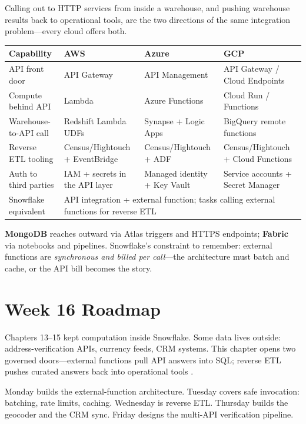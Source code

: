 \begin{crosscloud}
Calling out to HTTP services from inside a warehouse, and pushing warehouse results back to operational tools, are the two directions of the same integration problem---every cloud offers both.

\vspace{2mm}
{\footnotesize
\begin{tabular}{@{}p{2.8cm}p{3.0cm}p{3.0cm}p{3.0cm}@{}}
\toprule
\textbf{Capability} & \textbf{AWS} & \textbf{Azure} & \textbf{GCP} \\
\midrule
API front door & API Gateway & API Management & API Gateway / Cloud Endpoints \\
Compute behind API & Lambda & Azure Functions & Cloud Run / Functions \\
Warehouse-to-API call & Redshift Lambda UDFs & Synapse + Logic Apps & BigQuery remote functions \\
Reverse ETL tooling & Census/Hightouch + EventBridge & Census/Hightouch + ADF & Census/Hightouch + Cloud Functions \\
Auth to third parties & IAM + secrets in the API layer & Managed identity + Key Vault & Service accounts + Secret Manager \\
\addlinespace
Snowflake equivalent & \multicolumn{3}{l}{API integration + external function; tasks calling external functions for reverse ETL} \\
\bottomrule
\end{tabular}}

\vspace{1mm}
\textbf{MongoDB} reaches outward via Atlas triggers and HTTPS endpoints; \textbf{Fabric} via notebooks and pipelines. Snowflake's constraint to remember: external functions are \emph{synchronous and billed per call}---the architecture must batch and cache, or the API bill becomes the story.
\end{crosscloud}

\section{Week 16 Roadmap}
Chapters 13--15 kept computation inside Snowflake. Some data lives outside: address-verification APIs, currency feeds, CRM systems. This chapter opens two governed doors---external functions pull API answers into SQL; reverse ETL pushes curated answers back into operational tools \cite{snowflakeExternalFunctionsDocs}.

Monday builds the external-function architecture. Tuesday covers safe invocation: batching, rate limits, caching. Wednesday is reverse ETL. Thursday builds the geocoder and the CRM sync. Friday designs the multi-API verification pipeline.

